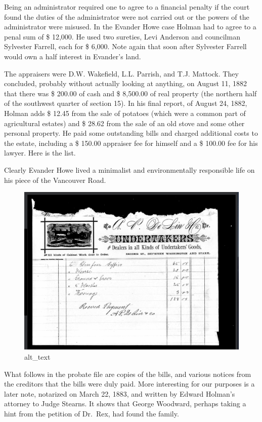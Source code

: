 \documentclass[
  12pt,
]{book}
\begin{document}
Being an administrator required one to agree to a financial penalty if the court found the duties of the administrator were not carried out or the powers of the administrator were misused. In the Evander Howe case Holman had to agree to a penal sum of \$ 12,000. He used two sureties, Levi Anderson and councilman Sylvester Farrell, each for \$ 6,000. Note again that soon after Sylvester Farrell would own a half interest in Evander's land.

The appraisers were D.W. Wakefield, L.L. Parrish, and T.J. Mattock. They concluded, probably without actually looking at anything, on August 11, 1882 that there was \$ 200.00 of cash and \$ 8,500.00 of real property (the northern half of the southwest quarter of section 15). In his final report, of August 24, 1882, Holman adds \$ 12.45 from the sale of potatoes (which were a common part of agricultural estates) and \$ 28.62 from the sale of an old stove and some other personal property. He paid some outstanding bills and charged additional costs to the estate, including a \$ 150.00 appraiser fee for himself and a \$ 100.00 fee for his lawyer. Here is the list.

Clearly Evander Howe lived a minimalist and environmentally responsible life on his piece of the Vancouver Road.

\begin{figure}
\centering
\includegraphics{images/0201b_images/image2.png}
\caption{alt\_text}
\end{figure}

What follows in the probate file are copies of the bills, and various notices from the creditors that the bills were duly paid. More interesting for our purposes is a later note, notarized on March 22, 1883, and written by Edward Holman's attorney to Judge Stearns. It shows that George Woodward, perhaps taking a hint from the petition of Dr.~Rex, had found the family.
\end{document}
